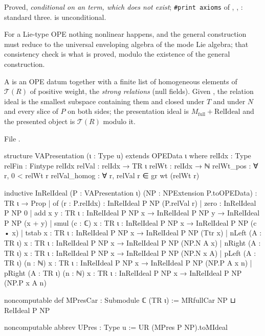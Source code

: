 \begin{status}
Proved, \emph{conditional on an  term, which does not exist}; \texttt{\#print axioms} of
, , : standard three.  is
unconditional.
\end{status}

\begin{physics}
For a Lie-type OPE nothing nonlinear happens, and the general construction must reduce to the universal enveloping algebra of the
mode Lie algebra; that consistency check is what is proved, modulo the existence of the general construction.
\end{physics}

\begin{definition}\label{l11:def:vapres}
A  is an OPE datum together with a finite list of homogeneous elements of $\mathcal T(R)$ of positive weight, the
\emph{strong relations} (null fields). Given , the relation ideal is the smallest subspace containing them and closed under
$T$ and under $N$ and every slice of $P$ on both sides; the presentation ideal is $M_{\mathrm{full}}+\mathrm{RelIdeal}$ and the
presented object is $\mathcal T(R)$ modulo it.
\end{definition}
\noindent File .
\begin{leancode}
structure VAPresentation (ι : Type u) extends OPEData ι where
  relIdx : Type
  relFin : Fintype relIdx
  relVal : relIdx → TR ι
  relWt : relIdx → ℕ
  relWt_pos : ∀ r, 0 < relWt r
  relVal_homog : ∀ r, relVal r ∈ gr wt (relWt r)

inductive InRelIdeal (P : VAPresentation ι) (NP : NPExtension P.toOPEData) : TR ι → Prop
  | of (r : P.relIdx) : InRelIdeal P NP (P.relVal r)
  | zero : InRelIdeal P NP 0
  | add {x y : TR ι} : InRelIdeal P NP x → InRelIdeal P NP y → InRelIdeal P NP (x + y)
  | smul (c : ℂ) {x : TR ι} : InRelIdeal P NP x → InRelIdeal P NP (c • x)
  | tstab {x : TR ι} : InRelIdeal P NP x → InRelIdeal P NP (Ttr x)
  | nLeft (A : TR ι) {x : TR ι} : InRelIdeal P NP x → InRelIdeal P NP (NP.N A x)
  | nRight (A : TR ι) {x : TR ι} : InRelIdeal P NP x → InRelIdeal P NP (NP.N x A)
  | pLeft (A : TR ι) (n : ℕ) {x : TR ι} : InRelIdeal P NP x → InRelIdeal P NP (NP.P A x n)
  | pRight (A : TR ι) (n : ℕ) {x : TR ι} : InRelIdeal P NP x → InRelIdeal P NP (NP.P x A n)

noncomputable def MPresCar : Submodule ℂ (TR ι) := MRfullCar NP ⊔ RelIdeal P NP

noncomputable abbrev UPres : Type u := UR (MPres P NP).toMIdeal
\end{leancode}

